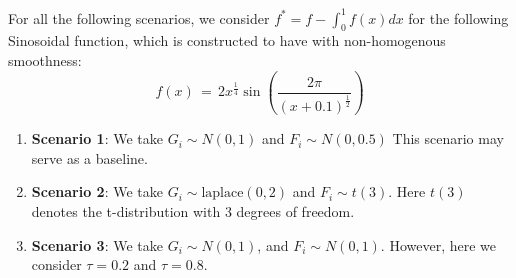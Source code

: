 \documentclass[twoside,11pt]{article}
\begin{document}
For all the following scenarios, we consider \( f^* = f - \int_{0}^{1} f(x)dx \) for the following Sinosoidal function, which is constructed to have with non-homogenous smoothness:
\[
    f(x) \,=\, 
    2x^{\frac{1}{4}} \sin \left( \frac{2\pi}{(x+0.1)^{\frac{1}{2}}} \right)
\]




    

\begin{enumerate}
    
\item \textbf{Scenario 1}: We take $G_i\sim N(0, 1)$ and $F_i\sim N(0, 0.5)$ This scenario may serve as a baseline. 

\item \textbf{Scenario 2}: We take $G_i\sim \text{laplace}(0, 2)$ and $F_i\sim t(3)$. Here $t(3)$ denotes the t-distribution with 3 degrees of freedom. 

 

\item \textbf{Scenario 3}: We take $G_i\sim N(0, 1)$, and $F_i\sim N(0, 1)$. However, here we consider $\tau = 0.2$ and $\tau = 0.8$. 

\end{enumerate}
\end{document}
